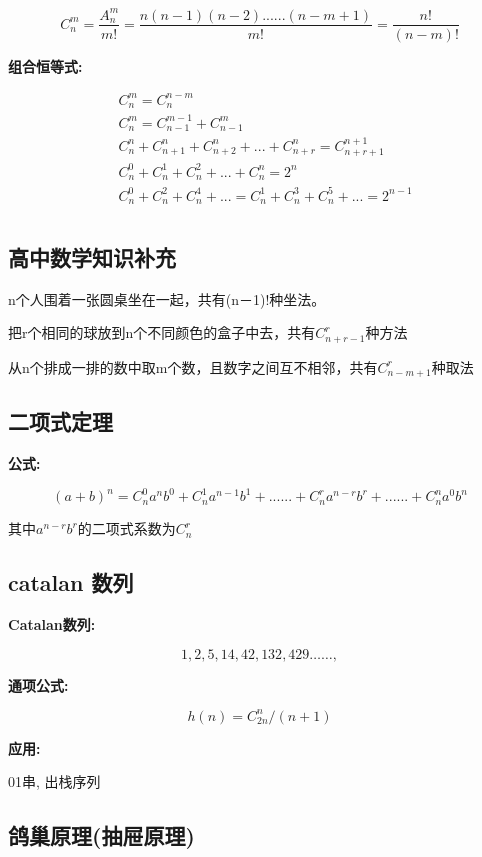  $$C_n^m =\frac{ A_n^m}{m!}=\frac{n(n-1)(n-2)......(n-m+1)}{m!}=\frac{n!}{(n-m)!}$$

\textbf{组合恒等式:}


\begin{align}
&C_n^m=C_n^{n-m}  \label{eq:rel1} \\
&C_n^m=C_{n-1}^{m-1}+C_{n-1}^{m}  \label{eq:rel2} \\
&C_n^n+C_{n+1}^n+C_{n+2}^n+...+C_{n+r}^n=C_{n+r+1}^{n+1} \label{eq:rel3} \\
&C_n^0+C_n^1+C_n^2+...+C_n^n=2^n \label{eq:rel4} \\
&C_n^0+C_n^2+C_n^4+...=C_n^1+C_n^3+C_n^5+...=2^{n-1} \label{eq:rel5} \\
\end{align}


\subsection{高中数学知识补充}

 n个人围着一张圆桌坐在一起，共有(n－1)!种坐法。

 把r个相同的球放到n个不同颜色的盒子中去，共有$C_{n+r-1}^r$种方法

 从n个排成一排的数中取m个数，且数字之间互不相邻，共有$C_{n-m+1}^r$种取法

\subsection{二项式定理}

\textbf{公式:}

$$(a+b)^n=C_n^0a^nb^0+C_n^1a^{n-1}b^1+......+C_n^ra^{n-r}b^r+......+C_n^na^{0}b^n$$

其中$a^{n-r}b^r$的二项式系数为$C_n^r$

\subsection{catalan 数列}

\textbf{Catalan数列:}

$$ 1,2,5,14,42,132,429……, $$

\textbf{通项公式:}

$$ h(n) = C_{2n}^{n} /(n+1)$$


\textbf{应用:}

01串, 出栈序列

\subsection{鸽巢原理(抽屉原理)}

